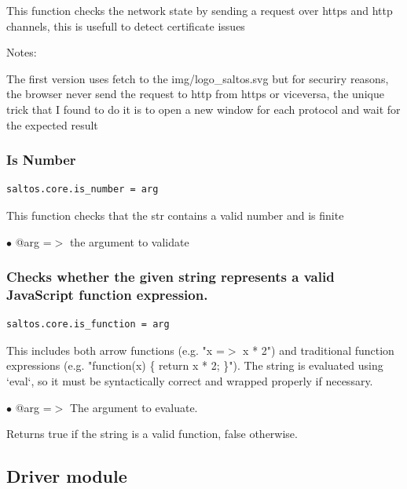 \documentclass[a4paper]{article}
\begin{document}
This function checks the network state by sending a request over https and http
channels, this is usefull to detect certificate issues

Notes:

The first version uses fetch to the img/logo\_saltos.svg but for securiry reasons,
the browser never send the request to http from https or viceversa, the unique trick
that I found to do it is to open a new window for each protocol and wait for the
expected result

\hypertarget{toc164}{}
\subsubsection{Is Number}

\begin{lstlisting}
saltos.core.is_number = arg
\end{lstlisting}

This function checks that the str contains a valid number and is finite

\begin{compactitem}
\item[\color{myblue}$\bullet$] @arg =$>$ the argument to validate
\end{compactitem}

\hypertarget{toc165}{}
\subsubsection{Checks whether the given string represents a valid JavaScript function expression.}

\begin{lstlisting}
saltos.core.is_function = arg
\end{lstlisting}

This includes both arrow functions (e.g. "x =$>$ x * 2") and traditional function expressions
(e.g. "function(x) \{ return x * 2; \}"). The string is evaluated using `eval`, so it must be
syntactically correct and wrapped properly if necessary.

\begin{compactitem}
\item[\color{myblue}$\bullet$] @arg =$>$ The argument to evaluate.
\end{compactitem}

Returns true if the string is a valid function, false otherwise.

\hypertarget{toc166}{}
\subsection{Driver module}
\end{document}
